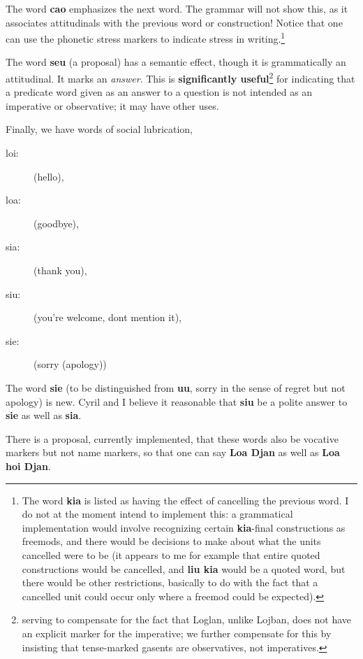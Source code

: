 \documentclass[12pt]{book}
\begin{document}
{The word {\bf cao} emphasizes the next word.   The grammar will not show this, as it associates attitudinals with the previous word or construction!   Notice that one can use the phonetic stress markers
to indicate stress in writing.\footnote{The word {\bf kia} is listed as having the effect of cancelling the previous word.  I do not at the moment intend to implement this:
a grammatical implementation would involve recognizing certain {\bf kia}-final constructions as freemods, and there would be decisions to make about what the units cancelled
were to be (it appears to me for example that entire quoted constructions would be cancelled, and {\bf liu kia} would be a quoted word, but there would be other restrictions, basically
to do with the fact that a cancelled unit could occur only where a freemod could be expected).}

The word {\bf seu} (a proposal) has a semantic effect, though it is grammatically an attitudinal.  It marks an {\em answer\/}.  This
is {\bf significantly useful}\footnote{serving to compensate for the fact that Loglan, unlike Lojban, does not have an explicit marker for the imperative; we further compensate for this by insisting that tense-marked gasents are observatives, not imperatives.} for indicating that a predicate word given as an answer to a question is not intended as an imperative or observative; it may have other uses.

Finally, we have words of social lubrication, 

\begin{description}
\item[loi:]  (hello),

\item[loa:]  (goodbye), 

\item[sia:]  (thank you), 

\item[siu:]   (you're welcome, dont mention it),

\item[sie:]  (sorry (apology))

\end{description}

The word {\bf sie} (to be distinguished from {\bf uu}, sorry in the sense of regret but not apology) is new.   Cyril and I believe it reasonable that {\bf siu} be a polite answer to {\bf sie} as well as {\bf sia}.   

There is a proposal, currently implemented, that these words also be vocative markers but not name markers, so that one can say {\bf Loa Djan} as well as {\bf Loa hoi Djan}.

}
\end{document}
